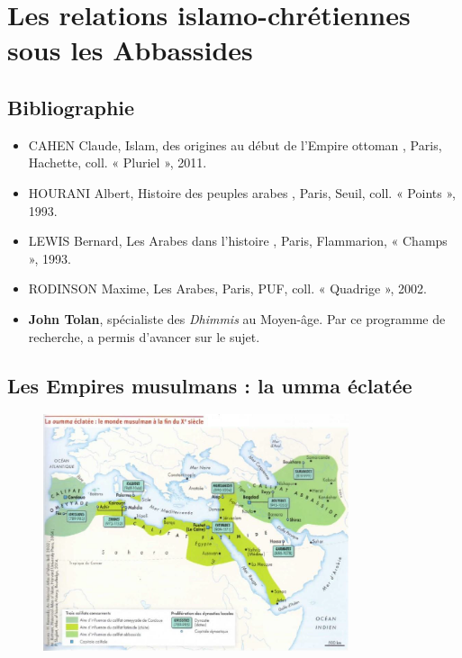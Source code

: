 \chapter{Les relations islamo-chrétiennes sous les Abbassides}

\section{Bibliographie}

\begin{itemize}
    \item 
CAHEN Claude,
Islam, des origines au début de l’Empire ottoman , Paris,
Hachette, coll. « Pluriel », 2011.
    \item 
HOURANI Albert,
Histoire des peuples arabes , Paris, Seuil, coll. « Points »,
1993.
    \item 
LEWIS Bernard,
Les Arabes dans l’histoire , Paris, Flammarion, « Champs »,
1993.
    \item 
RODINSON Maxime,
Les Arabes, Paris, PUF, coll. « Quadrige », 2002.
 
    \item \textbf{John Tolan}, spécialiste des \textit{Dhimmis} au Moyen-âge.
Par ce programme de recherche, a permis d'avancer sur le sujet.
\end{itemize}


\section{Les Empires musulmans : la umma éclatée}

\begin{figure}
    \centering
\includegraphics[width=0.8\textwidth]{HistoireIslamMediterranee/Images/SunnismeEclateX.png}
    \label{fig:my_label}
\end{figure}

